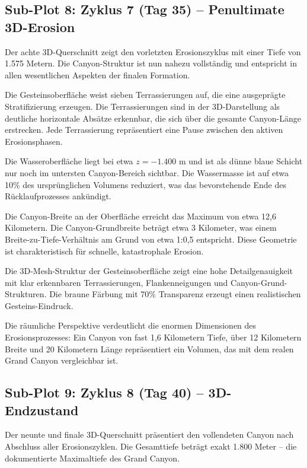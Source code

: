 ﻿\documentclass[12pt,a4paper]{report}
\begin{document}
\subsection{Sub-Plot 8: Zyklus 7 (Tag 35) -- Penultimate 3D-Erosion}

Der achte 3D-Querschnitt zeigt den vorletzten Erosionszyklus mit einer Tiefe von 1.575 Metern. Die Canyon-Struktur ist nun nahezu vollständig und entspricht in allen wesentlichen Aspekten der finalen Formation.

Die Gesteinsoberfläche weist sieben Terrassierungen auf, die eine ausgeprägte Stratifizierung erzeugen. Die Terrassierungen sind in der 3D-Darstellung als deutliche horizontale Absätze erkennbar, die sich über die gesamte Canyon-Länge erstrecken. Jede Terrassierung repräsentiert eine Pause zwischen den aktiven Erosionsphasen.

Die Wasseroberfläche liegt bei etwa $z = -1.400$ m und ist als dünne blaue Schicht nur noch im untersten Canyon-Bereich sichtbar. Die Wassermasse ist auf etwa 10\% des ursprünglichen Volumens reduziert, was das bevorstehende Ende des Rücklaufprozesses ankündigt.

Die Canyon-Breite an der Oberfläche erreicht das Maximum von etwa 12,6 Kilometern. Die Canyon-Grundbreite beträgt etwa 3 Kilometer, was einem Breite-zu-Tiefe-Verhältnis am Grund von etwa 1:0,5 entspricht. Diese Geometrie ist charakteristisch für schnelle, katastrophale Erosion.

Die 3D-Mesh-Struktur der Gesteinsoberfläche zeigt eine hohe Detailgenauigkeit mit klar erkennbaren Terrassierungen, Flankenneigungen und Canyon-Grund-Strukturen. Die braune Färbung mit 70\% Transparenz erzeugt einen realistischen Gesteins-Eindruck.

Die räumliche Perspektive verdeutlicht die enormen Dimensionen des Erosionsprozesses: Ein Canyon von fast 1,6 Kilometern Tiefe, über 12 Kilometern Breite und 20 Kilometern Länge repräsentiert ein Volumen, das mit dem realen Grand Canyon vergleichbar ist.

\subsection{Sub-Plot 9: Zyklus 8 (Tag 40) -- 3D-Endzustand}

Der neunte und finale 3D-Querschnitt präsentiert den vollendeten Canyon nach Abschluss aller Erosionszyklen. Die Gesamttiefe beträgt exakt 1.800 Meter -- die dokumentierte Maximaltiefe des Grand Canyon.
\end{document}
